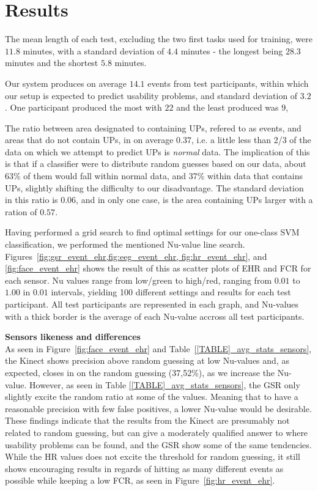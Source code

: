 \section{Results}
The mean length of each test, excluding the two first tasks used for training, were $11.8$ minutes, with a standard
deviation of $4.4$ minutes - the longest being $28.3$ minutes and the shortest $5.8$ minutes.

Our system produces on average $14.1$ events from test participants, within which our setup is expected to predict
usability problems, and standard deviation of $3.2$. One participant produced the most with $22$ and the least produced
was $9$,

The ratio between area designated to containing UPs, refered to as events, and areas that do not contain UPs, in on
average $0.37$, i.e. a little less than 2/3 of the data on which we attempt to predict UPs is \textit{normal} data. The
implication of this is that if a classifier were to distribute random guesses based on our data, about 63\% of them
would fall within normal data, and 37\% within data that contains UPs, slightly shifting the difficulty to our
disadvantage. The standard deviation in this ratio is $0.06$, and in only one case, is the area containing UPs larger
with a ration of $0.57$.



Having performed a grid search to find optimal settings for our one-class SVM classification, we performed the mentioned
Nu-value line search. Figures~\ref{fig:gsr_event_ehr,fig:eeg_event_ehr, fig:hr_event_ehr}, and \ref{fig:face_event_ehr}
shows the result of this as scatter plots of EHR and FCR for each sensor. Nu values range from low/green to high/red,
ranging from $0.01$ to $1.00$ in $0.01$ intervals, yielding 100 different settings and results for each test
participant. All test participants are represented in each graph, and Nu-values with a thick border is the average of
each Nu-value accross all test participants.

\textbf{Sensors likeness and differences}\\



As seen in Figure~\ref{fig:face_event_ehr} and Table~\ref{[TABLE]_avg_stats_sensors}, the Kinect shows precision above random guessing at low Nu-values and,
as expected, closes in on the random guessing (37,52\%), as we increase the Nu-value. However, as seen in Table
\ref{[TABLE]_avg_stats_sensors}, the GSR only slightly excite the random ratio at some of the values. Meaning that
to have a reasonable precision with few false positives, a lower Nu-value would be desirable.
These findings indicate that the results from the Kinect are presumably not related to random guessing, but can give a moderately qualified answer to where usability problems can be found, and the GSR show some of the same tendencies.
While the HR values does not excite the threshold for random guessing, it still shows encouraging results in regards of hitting as many different events as possible while keeping a low FCR, as seen in Figure~\ref{fig:hr_event_ehr}.

